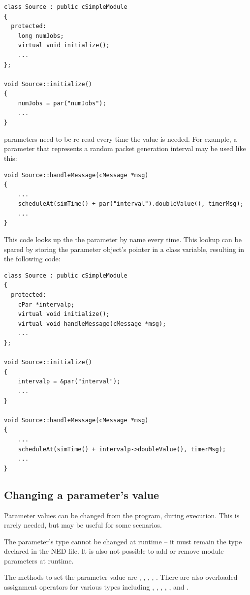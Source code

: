 \begin{verbatim}
class Source : public cSimpleModule
{
  protected:
    long numJobs;
    virtual void initialize();
    ...
};

void Source::initialize()
{
    numJobs = par("numJobs");
    ...
}
\end{verbatim}

 parameters need to be re-read every time the value is needed.
For example, a parameter that represents a random packet generation interval
may be used like this:

\begin{verbatim}
void Source::handleMessage(cMessage *msg)
{
    ...
    scheduleAt(simTime() + par("interval").doubleValue(), timerMsg);
    ...
}
\end{verbatim}

This code looks up the the parameter by name every time. This lookup
can be spared by storing the parameter object's pointer in a class variable,
resulting in the following code:

\begin{verbatim}
class Source : public cSimpleModule
{
  protected:
    cPar *intervalp;
    virtual void initialize();
    virtual void handleMessage(cMessage *msg);
    ...
};

void Source::initialize()
{
    intervalp = &par("interval");
    ...
}

void Source::handleMessage(cMessage *msg)
{
    ...
    scheduleAt(simTime() + intervalp->doubleValue(), timerMsg);
    ...
}
\end{verbatim}


\subsection{Changing a parameter's value}
\label{sec:simple-modules:setting-parameters}

Parameter values can be changed from the program, during execution.
This is rarely needed, but may be useful for some scenarios.

\begin{note}
    The parameter's type cannot be changed at runtime -- it must
    remain the type declared in the NED file. It is also not possible
    to add or remove module parameters at runtime.
\end{note}

The methods to set the parameter value are ,
, ,
, . There are also
overloaded assignment operators for various types including ,
, , , , and
.

